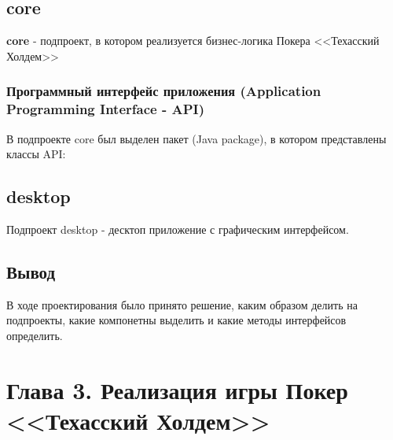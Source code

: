 
\subsection*{core}

\textbf{core} - подпроект, в котором реализуется бизнес-логика Покера <<Техасский Холдем>>

\subsubsection*{Программный интерфейс приложения (Application Programming Interface - API)}

В подпроекте core был выделен пакет (Java package), в котором представлены классы API:



\subsection*{desktop}

Подпроект desktop - десктоп приложение с графическим интерфейсом.

\subsection*{Вывод}

В ходе проектирования было принято решение, каким образом делить на подпроекты, какие компонетны выделить и какие методы интерфейсов определить.

\section*{Глава 3. Реализация игры Покер <<Техасский Холдем>>}


